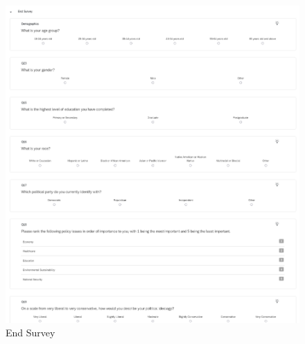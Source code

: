 \documentclass[
]{article}
\begin{document}
\begin{figure}
\hypertarget{fig:label}{%
\centering
\includegraphics[width=1\textwidth,height=1\textheight]{end_survey.png}
\caption{End Survey}\label{fig:label}
}
\end{figure}
\end{document}
